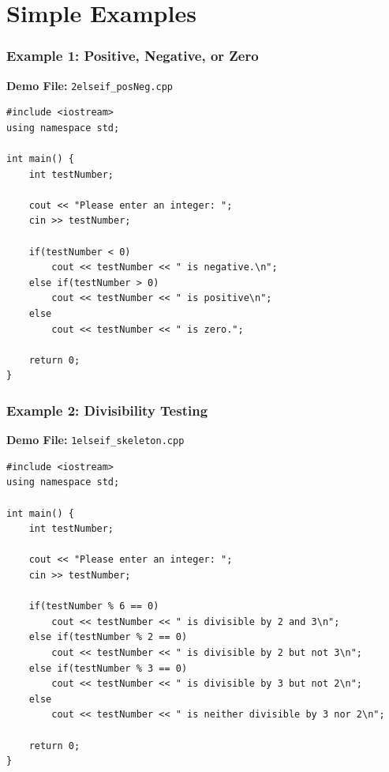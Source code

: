 \documentclass{beamer}
\begin{document}
\section{Simple Examples}

\begin{frame}[fragile]
\frametitle{Example 1: Positive, Negative, or Zero}
\textbf{Demo File:} \texttt{2elseif\_posNeg.cpp}

\begin{verbatim}
#include <iostream>
using namespace std;

int main() {
    int testNumber;
    
    cout << "Please enter an integer: ";
    cin >> testNumber;
    
    if(testNumber < 0)
        cout << testNumber << " is negative.\n";
    else if(testNumber > 0)
        cout << testNumber << " is positive\n";
    else
        cout << testNumber << " is zero.";
    
    return 0;
}
\end{verbatim}
\end{frame}

\begin{frame}[fragile]
\frametitle{Example 2: Divisibility Testing}
\textbf{Demo File:} \texttt{1elseif\_skeleton.cpp}

\begin{verbatim}
#include <iostream>
using namespace std;

int main() {
    int testNumber;
    
    cout << "Please enter an integer: ";
    cin >> testNumber;
    
    if(testNumber % 6 == 0)
        cout << testNumber << " is divisible by 2 and 3\n";
    else if(testNumber % 2 == 0)
        cout << testNumber << " is divisible by 2 but not 3\n";
    else if(testNumber % 3 == 0)
        cout << testNumber << " is divisible by 3 but not 2\n";
    else
        cout << testNumber << " is neither divisible by 3 nor 2\n";
    
    return 0;
}
\end{verbatim}
\end{frame}
\end{document}
